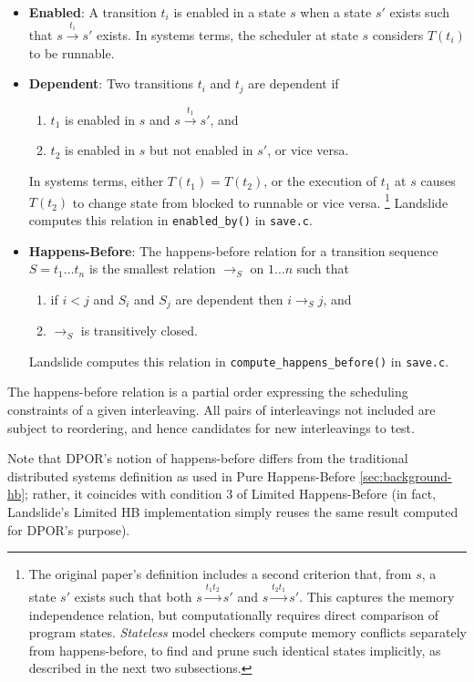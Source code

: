 \begin{itemize}
	\item {\bf Enabled}: A transition $t_i$ is enabled in a state $s$ when a state $s'$ exists such that $s \xrightarrow{t_i} s'$ exists.
		In systems  terms, the scheduler at state $s$ considers $T(t_i)$ to be runnable.
	\item {\bf Dependent}: Two transitions $t_i$ and $t_j$ are dependent if
		\begin{enumerate}
			\item $t_1$ is enabled in $s$ and $s \xrightarrow{t_1} s'$, and
			\item $t_2$ is enabled in $s$ but not enabled in $s'$, or vice versa.
		\end{enumerate}
		In systems terms, either $T(t_1) = T(t_2)$,
		or the execution of $t_1$ at $s$ causes $T(t_2)$
		to change state from blocked to runnable or vice versa.%
		\footnote{The original paper's definition includes a second criterion that, from $s$,
		a state $s'$ exists such that both $s \xrightarrow{t_1 t_2} s'$ and $s \xrightarrow{t_2 t_1} s'$.
		This captures the memory independence relation,
		but computationally requires direct comparison of program states.
		{\em Stateless} model checkers compute memory conflicts separately from happens-before,
		to find and prune such identical states implicitly,
		as described in the next two subsections.}
		Landslide computes this relation in {\tt enabled\_by()} in {\tt save.c}.
	\item {\bf Happens-Before}: The happens-before relation for a transition sequence $S = t_1 \dots t_n$
		is the smallest relation $\rightarrow_S$ on ${1 \dots n}$ such that
		\begin{enumerate}
			\item if $i < j$ and $S_i$ and $S_j$ are dependent then $i \rightarrow_S j$, and
			\item $\rightarrow_S$ is transitively closed.
		\end{enumerate}
		Landslide computes this relation in
		{\tt compute\_happens\_before()} in {\tt save.c}.
\end{itemize}
The happens-before relation is a partial order expressing the scheduling constraints of a given interleaving.
All pairs of interleavings not included are subject to reordering,
and hence candidates for new interleavings to test.

Note that DPOR's notion of happens-before differs from the traditional distributed systems definition \cite{lamport-clocks}
as used in Pure Happens-Before \cref{sec:background-hb};
rather, it coincides with condition 3 of Limited Happens-Before %
(in fact, Landslide's Limited HB implementation simply reuses the same result computed for DPOR's purpose).


